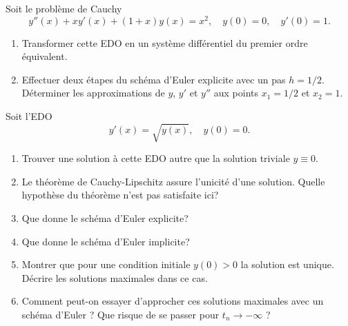 \documentclass[a4paper,12pt,reqno]{amsart}
\begin{document}


\begin{exo}

  Soit le problème de Cauchy
    \[
      y''(x)+xy'(x)+(1+x)y(x)=x^2, \quad y(0)=0, \quad y'(0)=1.
    \]
  \begin{enumerate}
    \item Transformer cette EDO en un système différentiel du premier ordre équivalent.
    \item Effectuer deux étapes du schéma d'Euler explicite avec un pas $h=1/2$. Déterminer les approximations de $y$, $y'$ et $y''$ aux points $x_1=1/2$ et $x_2=1$.
  \end{enumerate}
\end{exo}

\begin{exo}

  Soit l'EDO
    \[
      y'(x)=\sqrt{y(x)}, \quad y(0)=0.
    \]
  \begin{enumerate}
    \item Trouver une solution à cette EDO autre que la solution triviale $y \equiv 0$.
    \item Le théorème de Cauchy-Lipschitz assure l'unicité d'une solution. Quelle hypothèse du théorème n'est pas satisfaite ici?
    \item Que donne le schéma d'Euler explicite?
    \item Que donne le schéma d'Euler implicite?
    \item Montrer que pour une condition initiale $y(0) > 0$ la solution est unique. Décrire les solutions maximales dans ce cas.
    \item Comment peut-on essayer d'approcher ces solutions maximales avec un schéma d'Euler ? Que risque de se passer pour $t_{n} \rightarrow -\infty$ ?

  \end{enumerate}
\end{exo}
\end{document}
